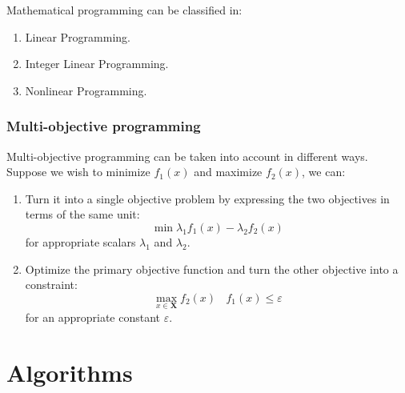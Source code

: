 \documentclass[12pt, a4paper]{report}
\begin{document}
    Mathematical programming can be classified in:
    \begin{enumerate}
        \item Linear Programming.
        \item Integer Linear Programming.
        \item Nonlinear Programming. 
    \end{enumerate}
    
    \subsection{Multi-objective programming}
    Multi-objective programming can be taken into account in different ways. Suppose we wish to minimize $f_1(x)$ and maximize $f_2(x)$, we can: 
    \begin{enumerate}
        \item Turn it into a single objective problem by expressing the two objectives in terms of the same unit: 
            \[\min{\lambda_1f_1(x)-\lambda_2f_2(x)}\]
            for appropriate scalars $\lambda_1$ and $\lambda_2$.
        \item Optimize the primary objective function and turn the other objective into a constraint: 
            \[\max_{x \in \boldsymbol{X}}f_2(x) \:\:\:\: f_1(x)\leq \varepsilon\]
            for an appropriate constant $\varepsilon$. 
    \end{enumerate}

\newpage

\chapter{Algorithms}
\end{document}
